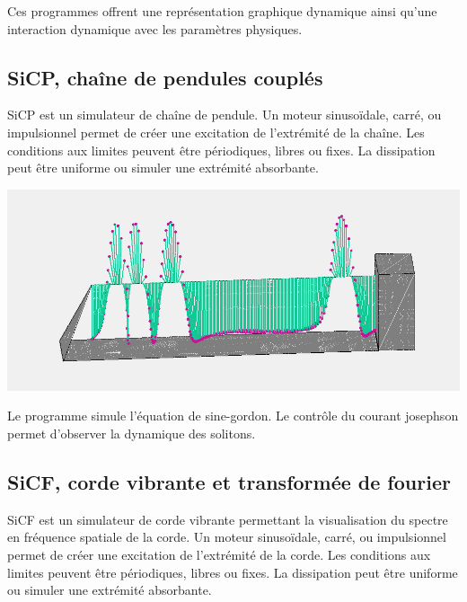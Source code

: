 %
Ces programmes offrent une représentation graphique dynamique ainsi qu'une interaction dynamique avec les paramètres physiques.
%
\subsection{SiCP, chaîne de pendules couplés}
%
SiCP est un simulateur de chaîne de pendule. Un moteur sinusoïdale, carré, ou impulsionnel permet de créer une excitation de l'extrémité de la chaîne. Les conditions aux limites peuvent être périodiques, libres ou fixes. La dissipation peut être uniforme ou simuler une extrémité absorbante.
%
\begin{center}
\includegraphics[scale=0.41]{./titre/SiCP}
\end{center}
%
Le programme simule l'équation de sine-gordon. Le contrôle du courant josephson permet d'observer la dynamique des solitons.
%
\subsection{SiCF, corde vibrante et transformée de fourier}
%
SiCF est un simulateur de corde vibrante permettant la visualisation du spectre en fréquence spatiale de la corde. Un moteur sinusoïdale, carré, ou impulsionnel permet de créer une excitation de l'extrémité de la corde. Les conditions aux limites peuvent être périodiques, libres ou fixes. La dissipation peut être uniforme ou simuler une extrémité absorbante.

